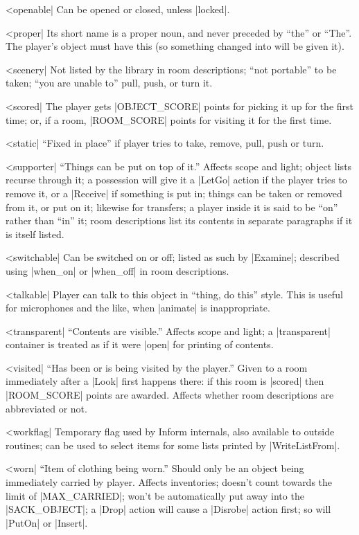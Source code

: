 {{{^^|openable|
Can be opened or closed, unless |locked|.

^^|proper|
Its short name is a proper noun, and never preceded
by ``the'' or ``The''.  The player's object must have this (so something
changed into will be given it).

^^|scenery|
Not listed by the library in room descriptions; ``not portable'' to be
taken; ``you are unable to'' pull, push, or turn it.

^^|scored|
The player gets |OBJECT_SCORE| points for picking
it up for the first time; or, if a room, |ROOM_SCORE| points for visiting
it for the first time.

^^|static|
``Fixed in place'' if player tries to take, remove,
pull, push or turn.

^^|supporter|
``Things can be put on top of it.''  Affects scope and light;
object lists recurse through it; a possession will give it a
|LetGo| action if the player tries to remove it, or a |Receive|
if something is put in; things can be taken or removed from it,
or put on it; likewise for transfers; a player inside it is said
to be ``on'' rather than ``in'' it; room descriptions list
its contents in separate paragraphs if it is itself listed.

^^|switchable|
Can be switched on or off; listed
as such by |Examine|; described using |when_on| or |when_off|
in room descriptions.

^^|talkable|
Player can talk to this object in
``thing, do this'' style.  This is useful for microphones and
the like, when |animate| is inappropriate.

^^|transparent|
``Contents are visible.''  Affects scope and light;
a |transparent| container is treated as if it were |open| for
printing of contents.

^^|visited|
``Has been or is being visited by the player.''
Given to a room immediately after a |Look| first
happens there: if this room is |scored| then |ROOM_SCORE| points
are awarded.  Affects whether room descriptions are abbreviated
or not.

^^|workflag|
Temporary flag used by Inform internals,
also available to outside routines; can be used to select items
for some lists printed by |WriteListFrom|.

^^|worn|
``Item of clothing being worn.''  Should
only be an object being immediately carried by player.
Affects inventories; doesn't count towards the limit of
|MAX_CARRIED|; won't be automatically put away into the
|SACK_OBJECT|; a |Drop| action will cause a |Disrobe| action first;
so will |PutOn| or |Insert|.

}}}
